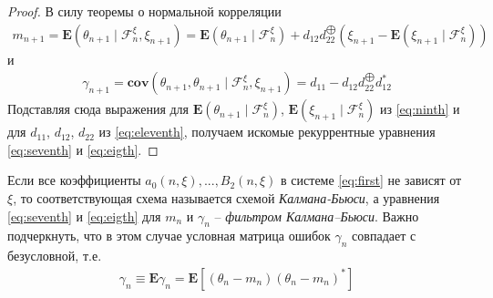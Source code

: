 \begin{proof}
	В силу теоремы о нормальной корреляции
	\begin{align*}
	m_{n + 1} = \mathbf{E}\left(\theta_{n + 1} \mid \mathscr{F}^\xi_n, \xi_{n + 1}\right) = \mathbf{E}\left(\theta_{n + 1} \mid \mathscr{F}^\xi_n\right) + d_{12} d_{22}^{\bigoplus}\left(\xi_{n + 1} - \mathbf{E}\left(\xi_{n + 1} \mid \mathscr{F}^\xi_n\right)\right)
	\end{align*}
	и
	\begin{align*}
	\gamma_{n + 1} = \mathbf{cov}\left(\theta_{n + 1}, \theta_{n + 1} \mid \mathscr{F}^\xi_n, \xi_{n + 1}\right) = d_{11} - d_{12}d_{22}^{\bigoplus}d_{12}^*
	\end{align*}
	Подставляя сюда выражения для $\mathbf{E}\left(\theta_{n + 1} \mid \mathscr{F}^\xi_n\right)$, $\mathbf{E}\left(\xi_{n + 1} \mid \mathscr{F}^\xi_n\right)$ из \eqref{eq:ninth} и для
	$d_{11}$, $d_{12}$, $d_{22}$ из \eqref{eq:eleventh}, получаем искомые рекуррентные уравнения \eqref{eq:seventh} и \eqref{eq:eigth}.
\end{proof}

\begin{corollary}
	Если все коэффициенты $a_0(n, \xi), ..., B_2(n, \xi)$ в системе \eqref{eq:first} не зависят от $\xi$, то соответствующая схема называется схемой \textit{Калмана-Бьюси}, а уравнения \eqref{eq:seventh} и \eqref{eq:eigth} для $m_n$ и $\gamma_n$ – \textit{фильтром Калмана–Бьюси}. Важно подчеркнуть, что в этом случае условная матрица ошибок $\gamma_n$ совпадает с безусловной, т.е.
	\begin{align*}
	\gamma_n \equiv \mathbf{E}\gamma_n = \mathbf{E}\left[(\theta_n - m_n)(\theta_n - m_n)^*\right]
	\end{align*}
\end{corollary}

